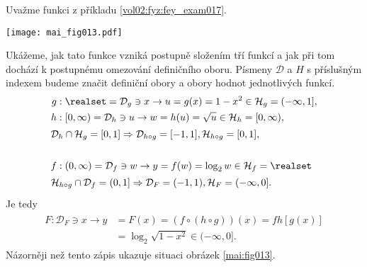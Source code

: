 \begin{mdframed}[style=mdexam]
  \begin{example}\label{MAI:exam025}
    Uvažme funkci z příkladu \ref{vol02:fyz:fey_exam017}. 
    
    {\centering
    \captionsetup{type=figure}
    \texttt{[image: mai\_fig013.pdf]}
    \par}
    
    Ukážeme, jak tato funkce vzniká postupně složením tří funkcí a jak při tom dochází k postupnému 
    omezování definičního oboru. Písmeny \(\mathcal{D}\) a \(H\) s příslušným indexem budeme značit 
    definiční obory a obory hodnot jednotlivých funkcí.
    \begin{gather*}
      \begin{align*}
        g&:  \realset =\mathcal{D}_g\ni x\rightarrow u=g(x) = 1- x^2  \in\mathcal{H}_g=(-\infty,1], \\
        h&: [0,\infty)=\mathcal{D}_h\ni u\rightarrow w=h(u) = \sqrt{u}\in\mathcal{H}_h=[0,\infty),  \\
       \shortintertext{\(\mathcal{D}_h\cap\mathcal{H}_g = [0,1]\Rightarrow\mathcal{D}_{h\circ g}=[-1,1], 
                       \mathcal{H}_{h\circ g} = [0,1],\)}                                    \\
       f&:(0,\infty)=\mathcal{D}_f\ni w \rightarrow y=f(w)=\log_2w\in\mathcal{H}_f=\realset  \\
       \shortintertext{\(\mathcal{H}_{h\circ g}\cap\mathcal{D}_f = (0,1] 
                       \Rightarrow\mathcal{D}_F=(-1,1),\mathcal{H}_F=(-\infty,0].\)} 
      \end{align*}
    \end{gather*}
    Je tedy
    \begin{gather*}
      \begin{align*}
        F:\mathcal{D}_F\ni x\rightarrow 
        y&=F(x)=(f\circ(h\circ g))(x) = f{h[g(x)]}          \\
        &= \log_2\sqrt{1-x^2}\in(-\infty,0].
      \end{align*}
    \end{gather*}
    Názorněji než tento zápis ukazuje situaci obrázek \ref{mai:fig013}.
  \end{example}
\end{mdframed}